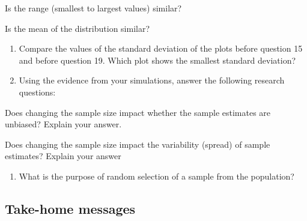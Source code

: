 \documentclass[
]{report}
\providecommand{\tightlist}{%
  \setlength{\itemsep}{0pt}\setlength{\parskip}{0pt}}
\newcommand{\rgi}{\hspace{24pt}}  %
\begin{document}
\rgi Is the range (smallest to largest values) similar?

\vspace{0.2in}

\rgi Is the mean of the distribution similar?

\vspace{0.2in}

\begin{enumerate}
\def\labelenumi{\arabic{enumi}.}
\setcounter{enumi}{19}
\item
  Compare the values of the standard deviation of the plots before question 15 and before question 19. Which plot shows the smallest standard deviation?
  \vspace{0.4in}
\item
  Using the evidence from your simulations, answer the following research questions:
\end{enumerate}

\rgi Does changing the sample size impact whether the sample estimates are unbiased? Explain your answer.
\vspace{0.5in}

\rgi Does changing the sample size impact the variability (spread) of sample estimates? Explain your answer
\vspace{0.5in}

\begin{enumerate}
\def\labelenumi{\arabic{enumi}.}
\setcounter{enumi}{21}
\tightlist
\item
  What is the purpose of random selection of a sample from the population?
\end{enumerate}

\vspace{0.8in}

\subsection{Take-home messages}\label{take-home-messages-2}
\end{document}
